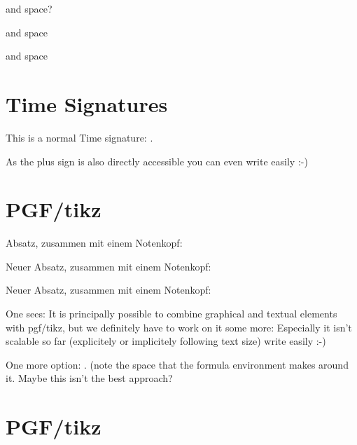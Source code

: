 \documentclass{scrartcl}
\begin{document}
 and space?

\lilyRFZ and space

 and space

\section*{Time Signatures}
	This is a normal Time signature: .
	
	As the plus sign is also directly accessible you can even
	write  easily :-)


	
\section*{PGF/tikz}

Absatz, zusammen mit einem Notenkopf: 

\Large
Neuer Absatz, zusammen mit einem Notenkopf: 

\normalsize
Neuer Absatz, zusammen mit einem Notenkopf: 

One sees: It is principally possible to combine graphical and textual elements with pgf/tikz,
but we definitely have to work on it some more: Especially it isn't scalable so far (explicitely or implicitely following text size)
	write  easily :-)
	
	One more option:  \lilyText{+} . (note the space that the formula environment makes around it. Maybe this isn't the best approach?

	
\section*{PGF/tikz}
\end{document}
